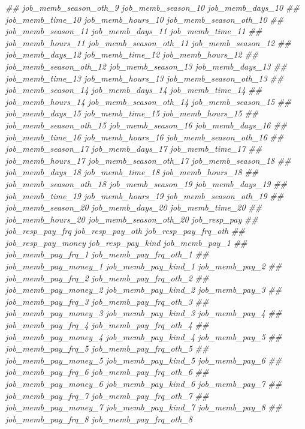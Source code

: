 \documentclass[
]{article}
\newenvironment{Shaded}{\begin{snugshade}}{\end{snugshade}}
\newcommand{\CommentTok}[1]{\textcolor[rgb]{0.56,0.35,0.01}{\textit{#1}}}
\begin{document}
\begin{Shaded}
\begin{Highlighting}[]
\CommentTok{##      job_memb_season_oth_9 job_memb_season_10 job_memb_days_10}
\CommentTok{##      job_memb_time_10 job_memb_hours_10 job_memb_season_oth_10}
\CommentTok{##      job_memb_season_11 job_memb_days_11 job_memb_time_11}
\CommentTok{##      job_memb_hours_11 job_memb_season_oth_11 job_memb_season_12}
\CommentTok{##      job_memb_days_12 job_memb_time_12 job_memb_hours_12}
\CommentTok{##      job_memb_season_oth_12 job_memb_season_13 job_memb_days_13}
\CommentTok{##      job_memb_time_13 job_memb_hours_13 job_memb_season_oth_13}
\CommentTok{##      job_memb_season_14 job_memb_days_14 job_memb_time_14}
\CommentTok{##      job_memb_hours_14 job_memb_season_oth_14 job_memb_season_15}
\CommentTok{##      job_memb_days_15 job_memb_time_15 job_memb_hours_15}
\CommentTok{##      job_memb_season_oth_15 job_memb_season_16 job_memb_days_16}
\CommentTok{##      job_memb_time_16 job_memb_hours_16 job_memb_season_oth_16}
\CommentTok{##      job_memb_season_17 job_memb_days_17 job_memb_time_17}
\CommentTok{##      job_memb_hours_17 job_memb_season_oth_17 job_memb_season_18}
\CommentTok{##      job_memb_days_18 job_memb_time_18 job_memb_hours_18}
\CommentTok{##      job_memb_season_oth_18 job_memb_season_19 job_memb_days_19}
\CommentTok{##      job_memb_time_19 job_memb_hours_19 job_memb_season_oth_19}
\CommentTok{##      job_memb_season_20 job_memb_days_20 job_memb_time_20}
\CommentTok{##      job_memb_hours_20 job_memb_season_oth_20 job_resp_pay}
\CommentTok{##      job_resp_pay_frq job_resp_pay_oth job_resp_pay_frq_oth}
\CommentTok{##      job_resp_pay_money job_resp_pay_kind job_memb_pay_1}
\CommentTok{##      job_memb_pay_frq_1 job_memb_pay_frq_oth_1}
\CommentTok{##      job_memb_pay_money_1 job_memb_pay_kind_1 job_memb_pay_2}
\CommentTok{##      job_memb_pay_frq_2 job_memb_pay_frq_oth_2}
\CommentTok{##      job_memb_pay_money_2 job_memb_pay_kind_2 job_memb_pay_3}
\CommentTok{##      job_memb_pay_frq_3 job_memb_pay_frq_oth_3}
\CommentTok{##      job_memb_pay_money_3 job_memb_pay_kind_3 job_memb_pay_4}
\CommentTok{##      job_memb_pay_frq_4 job_memb_pay_frq_oth_4}
\CommentTok{##      job_memb_pay_money_4 job_memb_pay_kind_4 job_memb_pay_5}
\CommentTok{##      job_memb_pay_frq_5 job_memb_pay_frq_oth_5}
\CommentTok{##      job_memb_pay_money_5 job_memb_pay_kind_5 job_memb_pay_6}
\CommentTok{##      job_memb_pay_frq_6 job_memb_pay_frq_oth_6}
\CommentTok{##      job_memb_pay_money_6 job_memb_pay_kind_6 job_memb_pay_7}
\CommentTok{##      job_memb_pay_frq_7 job_memb_pay_frq_oth_7}
\CommentTok{##      job_memb_pay_money_7 job_memb_pay_kind_7 job_memb_pay_8}
\CommentTok{##      job_memb_pay_frq_8 job_memb_pay_frq_oth_8}

\end{Highlighting}
\end{Shaded}
\end{document}
